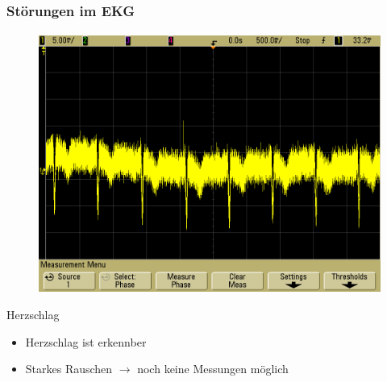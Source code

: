 \begin{frame}
\frametitle{Störungen im EKG}
\framesubtitle{}
\begin{figure}[H]
\begin{center}
        \includegraphics[scale=0.2]{./img/oszi/scope_4.png}
\end{center}
\end{figure}
\begin{block}{Herzschlag}
    \begin{itemize}
        \item Herzschlag ist erkennber 
        \item Starkes Rauschen $\rightarrow$ noch keine Messungen möglich
    \end{itemize}
\end{block}


\end{frame}
